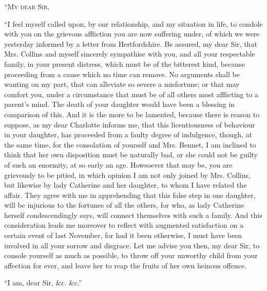 \begin{letter}
“\textsc{My dear Sir},

“I feel myself called upon, by our relationship, and
my situation in life, to condole with you on the grievous
affliction you are now suffering under, of which we were
yesterday informed by a letter from Hertfordshire. Be
assured, my dear Sir, that Mrs. Collins and myself sincerely
sympathise with you, and all your respectable family, in
your present distress, which must be of the bitterest kind,
because proceeding from a cause which no time can remove.
No arguments shall be wanting on my part, that can
alleviate so severe a misfortune; or that may comfort
you, under a circumstance that must be of all others most
afflicting to a parent’s mind. The death of your daughter
would have been a blessing in comparison of this. And
it is the more to be lamented, because there is reason to
suppose, as my dear Charlotte informs me, that this
licentiousness of behaviour in your daughter, has proceeded
from a faulty degree of indulgence, though, at the
same time, for the consolation of yourself and Mrs. Bennet,
I am inclined to think that her own disposition must be
naturally bad, or she could not be guilty of such an
enormity, at so early an age. Howsoever that may be,
you are grievously to be pitied, in which opinion I am not
only joined by Mrs. Collins, but likewise by lady Catherine
and her daughter, to whom I have related the affair.
They agree with me in apprehending that this false step
in one daughter, will be injurious to the fortunes of all
the others, for who, as lady Catherine herself condescendingly
says, will connect themselves with such a family.
And this consideration leads me moreover to reflect with
augmented satisfaction on a certain event of last November,
for had it been otherwise, I must have been involved
in all your sorrow and disgrace. Let me advise you then,
my dear Sir, to console yourself as much as possible, to
throw off your unworthy child from your affection for
ever, and leave her to reap the fruits of her own heinous
offence.

\raggedleft “I am, dear Sir, \&c. \&c.”
\end{letter}

